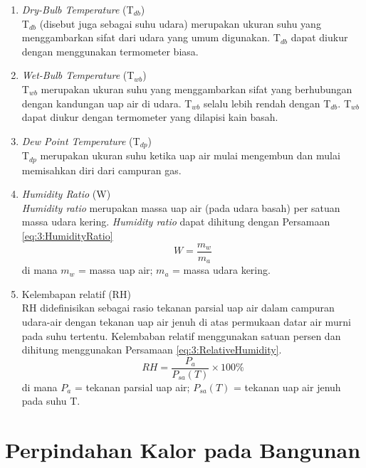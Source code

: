 \begin{enumerate}
	\item \textit{Dry-Bulb Temperature} (T$_{db}$) \\
	T$_{db}$ (disebut juga sebagai suhu udara) merupakan ukuran suhu yang menggambarkan sifat dari udara yang umum digunakan. T$_{db}$ dapat diukur dengan menggunakan termometer biasa.
	
	\item \textit{Wet-Bulb Temperature} (T$_{wb}$) \\
	T$_{wb}$ merupakan ukuran suhu yang menggambarkan sifat yang berhubungan dengan kandungan uap air di udara. T$_{wb}$ selalu lebih rendah dengan T$_{db}$. T$_{wb}$ dapat diukur dengan termometer yang dilapisi kain basah.
	
	\item \textit{Dew Point Temperature} (T$_{dp}$) \\
	T$_{dp}$ merupakan ukuran suhu ketika uap air mulai mengembun dan mulai memisahkan diri dari campuran gas.
	
	\item \textit{Humidity Ratio} (W)\\
	\textit{Humidity ratio} merupakan massa uap air (pada udara basah) per satuan massa udara kering. \textit{Humidity ratio} dapat dihitung dengan Persamaan \ref{eq:3:HumidityRatio}\\
	\begin{equation} \label{eq:3:HumidityRatio}
		W = \frac{m_w}{m_a} 
	\end{equation}
	di mana $m_w$ = massa uap air; $m_a$ = massa udara kering.
	
	\item Kelembapan relatif (RH) \\
	RH didefinisikan sebagai rasio tekanan parsial uap air dalam campuran udara-air dengan tekanan uap air jenuh di atas permukaan datar air murni pada suhu tertentu. Kelembaban relatif menggunakan satuan persen dan dihitung menggunakan Persamaan \ref{eq:3:RelativeHumidity}.
	\begin{equation} \label{eq:3:RelativeHumidity}
	RH = \frac{P_a}{P_{sa}(T)} \times 100\% 
	\end{equation}
	di mana $P_a$ = tekanan parsial uap air; $P_{sa}(T)$ = tekanan uap air jenuh pada suhu T.
\end{enumerate}

\section{Perpindahan Kalor pada Bangunan}

